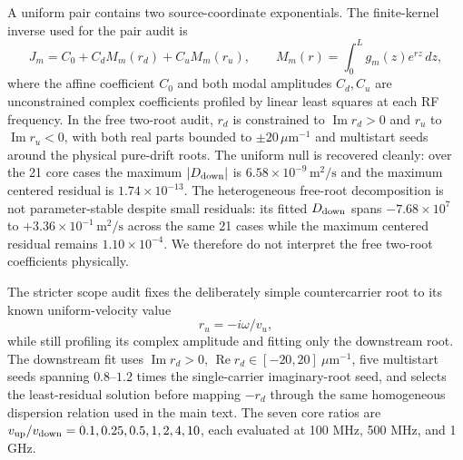 \documentclass[aps,pra,onecolumn,superscriptaddress,nofootinbib]{revtex4-2}
\begin{document}
A uniform pair contains two source-coordinate exponentials. The finite-kernel inverse used for the pair audit is
\begin{equation}
J_m=C_0+C_d M_m(r_d)+C_u M_m(r_u),
\qquad
M_m(r)=\int_0^L g_m(z)e^{rz}\,dz,
\end{equation}
where the affine coefficient $C_0$ and both modal amplitudes $C_d,C_u$ are unconstrained complex coefficients profiled by linear least squares at each RF frequency. In the free two-root audit, $r_d$ is constrained to $\operatorname{Im}r_d>0$ and $r_u$ to $\operatorname{Im}r_u<0$, with both real parts bounded to $\pm20\,\mu\mathrm{m}^{-1}$ and multistart seeds around the physical pure-drift roots. The uniform null is recovered cleanly: over the 21 core cases the maximum $|D_{\rm down}|$ is $6.58\times10^{-9}\,\mathrm{m^2/s}$ and the maximum centered residual is $1.74\times10^{-13}$. The heterogeneous free-root decomposition is not parameter-stable despite small residuals: its fitted $D_{\rm down}$ spans $-7.68\times10^{7}$ to $+3.36\times10^{-1}\,\mathrm{m^2/s}$ across the same 21 cases while the maximum centered residual remains $1.10\times10^{-4}$. We therefore do not interpret the free two-root coefficients physically.

The stricter scope audit fixes the deliberately simple countercarrier root to its known uniform-velocity value
\begin{equation}
r_u=-i\omega/v_u,
\end{equation}
while still profiling its complex amplitude and fitting only the downstream root. The downstream fit uses $\operatorname{Im}r_d>0$, $\operatorname{Re}r_d\in[-20,20]~\mu\mathrm{m}^{-1}$, five multistart seeds spanning $0.8$--$1.2$ times the single-carrier imaginary-root seed, and selects the least-residual solution before mapping $-r_d$ through the same homogeneous dispersion relation used in the main text. The seven core ratios are $v_{\rm up}/v_{\rm down}=0.1,0.25,0.5,1,2,4,10$, each evaluated at 100 MHz, 500 MHz, and 1 GHz.
\end{document}
